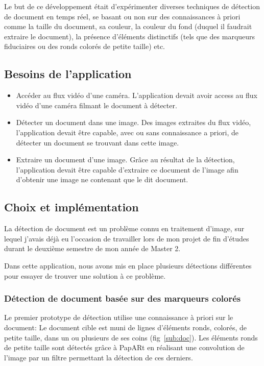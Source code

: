 Le but de ce développement était d'expérimenter diverses techniques de détection de document en temps réel, se basant ou non sur des connaissances à priori comme la taille du document, sa couleur, la couleur du fond (duquel il faudrait extraire le document), la présence d'éléments distinctifs (tels que des marqueurs fiduciaires ou des ronds colorés de petite taille) etc.

\subsection{Besoins de l'application}
\label{subsec:doc:content}
\begin{itemize}
\item Accéder au flux vidéo d'une caméra. L'application devait avoir access au flux vidéo d'une caméra filmant le document à détecter.
\item Détecter un document dans une image. Des images extraites du flux vidéo, l'application devait être capable, avec ou sans connaissance a priori, de détecter un document se trouvant dans cette image.
\item Extraire un document d'une image. Grâce au résultat de la détection, l'application devait être capable d'extraire ce document de l'image afin d'obtenir une image ne contenant que le dit document.
\end{itemize}

\subsection{Choix et implémentation}
\label{subsec:doc:impl}

La détection de document est un problème connu en traitement d'image, sur lequel j'avais déjà eu l'occasion de travailler lors de mon projet de fin d'études durant le deuxième semestre de mon année de Master 2.

Dans cette application, nous avons mis en place plusieurs détections différentes pour essayer de trouver une solution à ce problème.

\subsubsection{Détection de document basée sur des marqueurs colorés} Le premier prototype de détection utilise une connaissance à priori sur le document: Le document cible est muni de lignes d'éléments ronds, colorés, de petite taille, dans un ou plusieurs de ses coins (fig~\ref{sub:doc}). Les éléments ronds de petite taille sont détectés grâce à PapARt en réalisant une convolution de l'image par un filtre permettant la détection de ces derniers.

